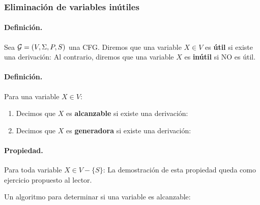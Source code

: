 \subsubsection{Eliminación de variables inútiles}

\paragraph{Definición.} Sea $\mathcal{G} = (V,\Sigma,P,S)$ una CFG. Diremos que una variable $X \in V$ es \textbf{útil} si existe una derivación:
Al contrario, diremos que una variable $X$ es \textbf{inútil} si NO es útil.

\paragraph{Definición.} Para una variable $X \in V$:
\begin{enumerate}
    \item Decimos que $X$ es \textbf{alcanzable} si existe una derivación:
    \item Decimos que $X$ es \textbf{generadora} si existe una derivación:
\end{enumerate}

\paragraph{Propiedad.} Para toda variable $X \in V - \{S\}$:
La demostración de esta propiedad queda como ejercicio propuesto al lector. \medbreak

Un algoritmo para determinar si una variable es alcanzable:
\begin{algorithm}[hbt!]
    \DontPrintSemicolon
\end{algorithm}

